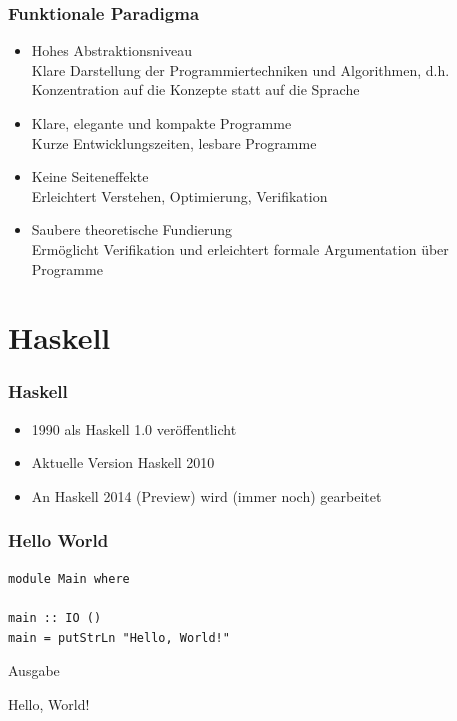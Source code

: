 \documentclass[fleqn,11pt,aspectratio=43]{beamer}
\begin{document}
\begin{frame}
\frametitle{Funktionale Paradigma}
\begin{block}{\vspace*{-2ex}}
\begin{itemize}
  \item Hohes Abstraktionsniveau \\ 
  Klare Darstellung der Programmiertechniken und Algorithmen,
d.h. Konzentration auf die Konzepte statt auf die Sprache
  \item Klare, elegante und kompakte Programme \\ 
  Kurze Entwicklungszeiten, lesbare Programme
  \item Keine Seiteneffekte \\ 
  Erleichtert Verstehen, Optimierung, Verifikation
  \item Saubere theoretische Fundierung \\ 
  Ermöglicht Verifikation und erleichtert formale Argumentation über Programme
\end{itemize}
\end{block}
\end{frame}

\section{Haskell~}
\begin{frame}
\frametitle{Haskell}
\begin{block}{\vspace*{-2ex}}
\begin{itemize}
  \item 1990 als Haskell 1.0 veröffentlicht
  \item Aktuelle Version Haskell 2010
  \item An Haskell 2014 (Preview) wird (immer noch) \glqq gearbeitet\grqq
\end{itemize}
\end{block}
\end{frame}

\begin{frame}[fragile]
\frametitle{Hello World} 
\begin{lstlisting}
module Main where
 
main :: IO ()
main = putStrLn "Hello, World!"
\end{lstlisting}
\pause
\begin{block}{Ausgabe}
\begin{center}
Hello, World!
\end{center}
\end{block}
\end{frame}
\end{document}
